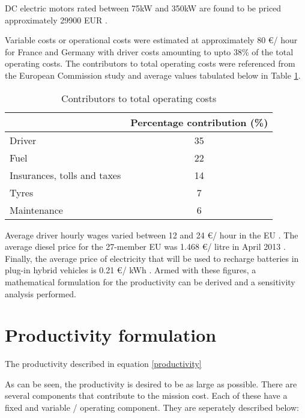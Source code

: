 \documentclass[ExampleMasters.tex]{subfiles}
\begin{document}
		DC electric motors rated between 75kW and 350kW are found to be priced approximately 29900 EUR \cite{EuPLot30Motors}.

		Variable costs or operational costs were estimated at approximately 80 \euro / hour for France and Germany \cite{EuAECOM1} with driver costs amounting to upto 38\% of the total operating costs. The contributors to total operating costs were referenced from the European Commission study \cite[T.~7b]{EuAECOM2} and average values tabulated below in Table \ref{table:OperatingCostContributors}.\\

		\begin{table}[ht]
			\centering 
			\begin{tabular}{l c}
				\hline
				\ & Percentage contribution (\%)\\
				\hline
			    Driver  & 35\\
			    Fuel  & 22\\
			    Insurances, tolls and taxes & 14\\
			    Tyres & 7\\
			    Maintenance & 6\\
				\hline 
			\end{tabular}
			\caption{Contributors to total operating costs \cite[T.~7b]{EuAECOM2}} 
			\label{table:OperatingCostContributors} 
		\end{table}

		Average driver hourly wages varied between 12 and 24 \euro / hour in the EU \cite[T.~7.2]{EuAECOM1}. The average diesel price for the 27-member EU was 1.468 \euro / litre in April 2013 \cite[T.~7.3]{EuAECOM1}. Finally, the average price of electricity that will be used to recharge batteries in plug-in hybrid vehicles is 0.21 \euro / kWh \cite{EUelectricity}. Armed with these figures, a mathematical formulation for the productivity can be derived and a sensitivity analysis performed.  

	\section{Productivity formulation}

		The productivity described in equation \ref{productivity}

		As can be seen, the productivity is desired to be as large as possible. There are several components that contribute to the mission cost. Each of these have a fixed and variable / operating component. They are seperately described below:\\
\end{document}
